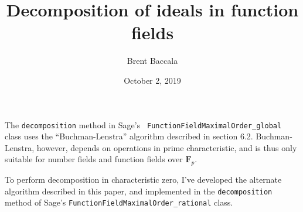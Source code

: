 \documentclass{article}
\newcommand{\Bold}[1]{\mathbf{#1}}
\newcommand{\FF}{\Bold{F}}
\begin{document}
\newenvironment{sagespacedblock}{\renewcommand{\sageoutputmath}[1]{}\setpythontexautoprint{false}\sagecode}{\setpythontexautoprint{true}\endsagecode


%

\def\sageinputcodebreak{}
\renewcommand{\sageinputcode}{
\sageinputcodebreak
\bgroup
\def\arraystretch{1.5}
\begin{tabular}{L{1cm} L{10cm}}
\textcolor{blue}{\ttfamily sage:} &
\textcolor{Brown}{\BUseVerbatim[baseline=t]{SageCode}}
\end{tabular}
\egroup
\def\sageinputcodebreak{\break}
}

\renewcommand{\sageoutputmath}[1]{
\def\sageinputcodebreak{}
\begin{dmath*}
##1
\end{dmath*}
}

\begin{mdframed}[backgroundcolor=yellow!20]
\printpythontex
\end{mdframed}
}





\title{Decomposition of ideals in function fields}
\author{Brent Baccala}
\date{October 2, 2019}
\maketitle


The {\tt decomposition} method in Sage's {\tt
  FunctionFieldMaximalOrder\_global} class uses the ``Buchman-Lenstra''
algorithm described in \cite{cohen} section 6.2.  Buchman-Lenstra,
however, depends on operations in prime characteristic, and is thus
only suitable for number fields and function fields over $\FF_p$.

To perform decomposition in characteristic zero, I've developed
the alternate algorithm described in this paper, and implemented
in the {\tt decomposition} method of Sage's {\tt FunctionFieldMaximalOrder\_rational} class.
\end{document}
